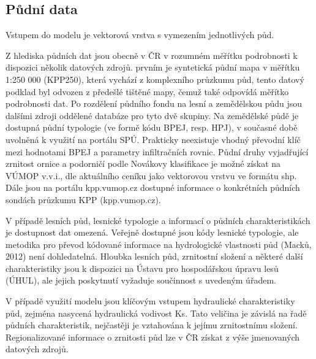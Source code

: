 % 

 
 
 
 
 
 
 
 
 
 
 
 
 
 
 
 
 
 
 
\subsection{Půdní data} \label{sec:vstuppuda}


Vstupem do modelu je vektorová vrstva s vymezením jednotlivých půd.

Z hlediska půdních dat jsou obecně v ČR v rozumném měřítku podrobnosti k dispozici několik datových zdrojů. prvním je syntetická půdní mapa v měřítku 1:250 000 (KPP250), která vychází z komplexního průzkumu půd, tento datový podklad byl odvozen z předešlé tištěné mapy, čemuž také odpovídá měřítko podrobnosti dat. Po rozdělení půdního fondu na lesní a zemědělskou půdu jsou dalšími zdroji oddělené databáze pro tyto dvě skupiny. Na zemědělské půdě je dostupná půdní typologie (ve formě kódu BPEJ, resp. HPJ),  v současné době uvolněná k využití na portálu SPÚ. Prakticky neexistuje vhodný převodní klíč mezi hodnotami BPEJ a parametry infiltračních rovnic. Půdní druhy vyjadřující zrnitost ornice a podorničí podle Novákovy klasifikace je možné získat na VÚMOP v.v.i., dle aktuálního ceníku jako vektorovou vrstvu ve formátu shp. Dále jsou na portálu kpp.vumop.cz dostupné informace o konkrétních půdních sondách průzkumu KPP (kpp.vumop.cz).

V případě lesních půd, lesnické typologie a informací o půdních charakteristikách je dostupnost dat omezená. Veřejně dostupné jsou kódy lesnické typologie, ale metodika pro převod kódované informace na hydrologické vlastnosti půd (Macků, 2012) není dohledatelná. Hloubka lesních půd, zrnitostní složení a některé další charakteristiky jsou k dispozici na Ústavu pro hospodářskou úpravu lesů (ÚHUL), ale jejich poskytnutí vyžaduje součinnost s uvedeným úřadem. 

V případě využití modelu jsou klíčovým vstupem hydraulické charakteristiky půd, zejména nasycená hydraulická vodivost \acs{Ks}. Tato veličina je závislá na řadě půdních charakteristik, nejčastěji je vztahována k jejímu zrnitostnímu složení. Regionalizované informace o zrnitosti půd lze v ČR získat z výše jmenovaných datových zdrojů. 

